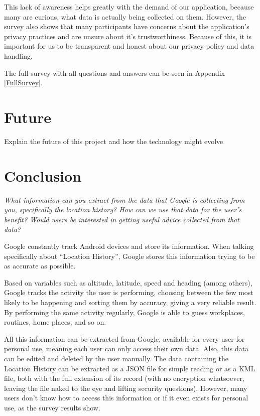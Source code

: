 \documentclass[12p]{article}
\begin{document}
This lack of awareness helps greatly with the demand of our application, because many are curious, what data is actually being collected on them. However, the survey also shows that many participants have concerns about the application's privacy practices and are unsure about it's trustworthiness. Because of this, it is important for us to be transparent and honest about our privacy policy and data handling.

The full survey with all questions and answers can be seen in Appendix \ref{FullSurvey}.


\newpage
\section{Future} \label{sec:Future}

Explain the future of this project and how the technology might evolve

\newpage
\section{Conclusion} \label{sec:Conclusion}

\textit{What information can you extract from the data that Google is collecting from you, specifically the location history?  How can we use that data for the user’s benefit?  Would users be interested in getting useful advice collected from that data?}

Google constantly track Android devices and store its information. When talking specifically about “Location History”, Google stores this information trying to be as accurate as possible.

Based on variables such as altitude, latitude, speed and heading (among others), Google tracks the activity the user is performing, choosing between the few most likely to be happening and sorting them by accuracy, giving a very reliable result.
By performing the same activity regularly, Google is able to guess workplaces, routines, home places, and so on.

All this information can be extracted from Google, available for every user for personal use, meaning each user can only access their own data. Also, this data can be edited and deleted by the user manually. 
The data containing the Location History can be extracted as a JSON file for simple reading or as a KML file, both with the full extension of its record (with no encryption whatsoever, leaving the file naked to the eye and lifting security questions). However, many users don't know how to access this information or if it even exists for personal use, as the survey results show.
\end{document}
